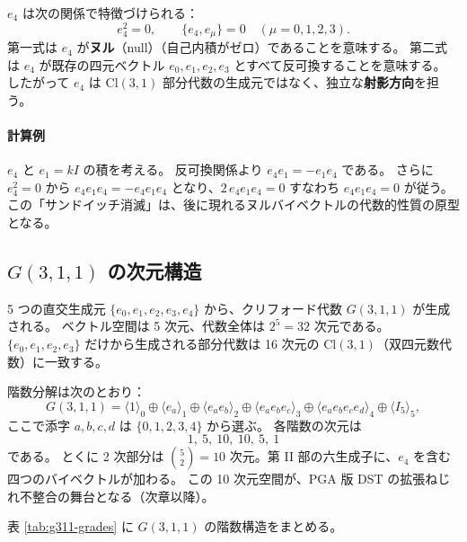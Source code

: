 \documentclass[dvipdfmx,a4paper,oneside]{jsbook}
\numberwithin{equation}{chapter}
\begin{document}
\(e_4\) は次の関係で特徴づけられる：
\begin{equation}
  e_4^2 = 0, \qquad \{e_4, e_\mu\} = 0 \quad (\mu = 0,1,2,3).
  \label{eq:e4-definitions}
\end{equation}
第一式は \(e_4\) が\textbf{ヌル}（null）（自己内積がゼロ）であることを意味する。
第二式は \(e_4\) が既存の四元ベクトル \(e_0,e_1,e_2,e_3\) とすべて反可換することを意味する。
したがって \(e_4\) は \(\mathrm{Cl}(3,1)\) 部分代数の生成元ではなく、独立な\textbf{射影方向}を担う。

\paragraph{計算例}
\(e_4\) と \(e_1 = kI\) の積を考える。
反可換関係より \(e_4 e_1 = -e_1 e_4\) である。
さらに \(e_4^2 = 0\) から \(e_4 e_1 e_4 = -e_4 e_1 e_4\) となり、\(2\,e_4 e_1 e_4 = 0\) すなわち \(e_4 e_1 e_4 = 0\) が従う。この「サンドイッチ消滅」は、後に現れるヌルバイベクトルの代数的性質の原型となる。

\subsection{\(G(3,1,1)\) の次元構造}

5 つの直交生成元 \(\{e_0,e_1,e_2,e_3,e_4\}\) から、クリフォード代数 \(G(3,1,1)\) が生成される。
ベクトル空間は 5 次元、代数全体は \(2^5 = 32\) 次元である。
\(\{e_0,e_1,e_2,e_3\}\) だけから生成される部分代数は 16 次元の \(\mathrm{Cl}(3,1)\)（双四元数代数）に一致する。

階数分解は次のとおり：
\begin{equation}
  G(3,1,1)
  = \langle 1 \rangle_0 \oplus \langle e_a \rangle_1 \oplus \langle e_a e_b \rangle_2
  \oplus \langle e_a e_b e_c \rangle_3 \oplus \langle e_a e_b e_c e_d \rangle_4
  \oplus \langle I_5 \rangle_5,
  \label{eq:g311-grade-decomp}
\end{equation}
ここで添字 \(a,b,c,d\) は \(\{0,1,2,3,4\}\) から選ぶ。
各階数の次元は
\begin{equation}
  1,\ 5,\ 10,\ 10,\ 5,\ 1
  \label{eq:g311-grade-dims}
\end{equation}
である。
とくに 2 次部分は \(\binom{5}{2} = 10\) 次元。第 II 部の六生成子に、\(e_4\) を含む四つのバイベクトルが加わる。
この 10 次元空間が、PGA 版 DST の拡張ねじれ不整合の舞台となる（次章以降）。

表 \ref{tab:g311-grades} に \(G(3,1,1)\) の階数構造をまとめる。
\end{document}
